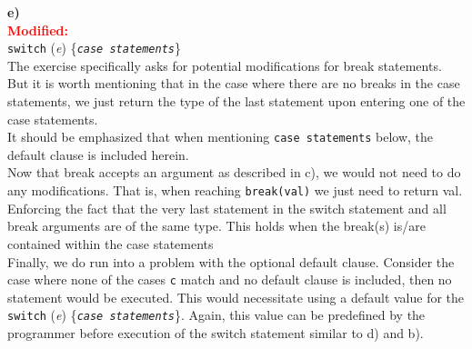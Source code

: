 \textbf{e)}\\
\textcolor{red}{\textbf{Modified:}}\\
\texttt{switch} (\textit{e}) \{\textit{\texttt{case statements}}\}\\
The exercise specifically asks for potential modifications for break statements. But it is worth mentioning that in the case where there are no breaks in the case statements, we just return the type of the last statement upon entering one of the case statements. \\
It should be emphasized that when mentioning \texttt{case statements} below, the default clause is included herein.\\

Now that break accepts an argument as described in c), we would not need to do any modifications. That is, when reaching  \texttt{break(val)} we just need to return val. Enforcing the fact that the very last statement in the switch statement and all break arguments are of the same type. This holds when the break(s) is/are contained within the case statements\\

Finally, we do run into a problem with the optional default clause. Consider the case where none of the cases \texttt{c} match and no default clause is included, then no statement would be executed. This would necessitate using a default value for the \texttt{switch} (\textit{e}) \{\textit{\texttt{case statements}}\}. Again, this value can be predefined by the programmer before execution of the switch statement similar to d) and b). 

